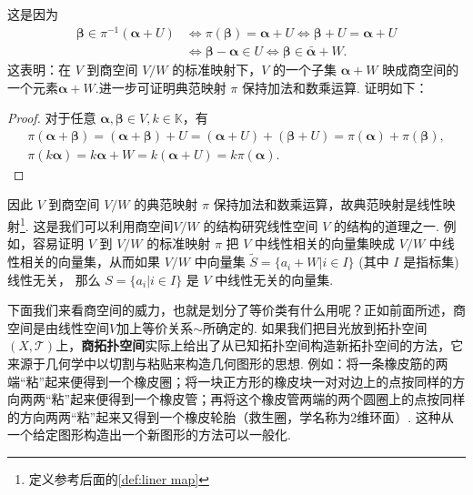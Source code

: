 \documentclass[12pt, a4paper,newtx]{ctexart}
\begin{document}
这是因为\begin{align*}
	\bm\beta \in \pi^{-1}(\bm\alpha + U) &\Longleftrightarrow \pi(\bm\beta) = \bm\alpha + U \Longleftrightarrow \bm\beta + U = \bm\alpha + U\\&\Longleftrightarrow \bm\beta - \bm\alpha \in U \Longleftrightarrow \bm\beta \in \bar{\bm\alpha} + W.
\end{align*}
这表明：在 $V$ 到商空间 $V/W$ 的标准映射下，$V$ 的一个子集 $\bm\alpha+W$ 映成商空间的一个元素$\bm\alpha+W.$进一步可证明典范映射 $\pi$ 保持加法和数乘运算. 证明如下：
\begin{proof}
对于任意 $\bm\alpha, \bm\beta \in V, k \in \mathbb K$，有\begin{gather*}
	\pi(\bm\alpha + \bm\beta) = (\bm\alpha + \bm\beta) + U = (\bm\alpha + U) + (\bm\beta + U) = \pi(\bm\alpha) + \pi(\bm\beta),\\\pi(k\bm\alpha) = k\bm\alpha + W = k(\bm\alpha + U) = k\pi(\bm\alpha). 
\end{gather*}
\end{proof}
因此 $V$ 到商空间 $V/W$ 的典范映射 $\pi$ 保持加法和数乘运算，故典范映射是线性映射\footnote{定义参考后面的\ref{def:liner map}}. 这是我们可以利用商空间$V/W$ 的结构研究线性空间 $V$ 的结构的道理之一. 
例如，容易证明 $V$ 到 $V/W$ 的标准映射 $\pi$ 把 $V$ 中线性相关的向量集映成 $V/W$ 中线性相关的向量集，从而如果 $V/W$ 中向量集 $\widetilde{S} = \{a_i + W | i \in I\}$ (其中 $I$ 是指标集)线性无关，
那么 $S = \{a_i | i \in I\}$ 是 $V$ 中线性无关的向量集. 

下面我们来看商空间的威力，也就是划分了等价类有什么用呢？正如前面所述，商空间是由线性空间$V$加上等价关系$\sim$所确定的. 如果我们把目光放到拓扑空间$(X,\mathscr T)$上，\textbf{商拓扑空间}实际上给出了从已知拓扑空间构造新拓扑空间的方法，它来源于几何学中以切割与粘贴来构造几何图形的思想. 例如：将一条橡皮筋的两端“粘”起来便得到一个橡皮圈；将一块正方形的橡皮块一对对边上的点按同样的方向两两“粘”起来便得到一个橡皮管；再将这个橡皮管两端的两个圆圈上的点按同样的方向两两“粘”起来又得到一个橡皮轮胎（救生圈，学名称为2维环面）. 这种从一个给定图形构造出一个新图形的方法可以一般化.\cite{4}
\end{document}
